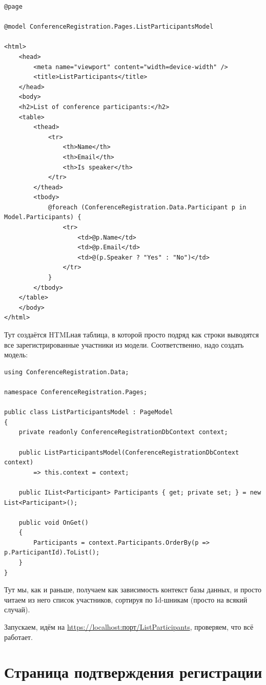 \documentclass[a5paper]{article}
\begin{document}
\begin{verbatim}
@page

@model ConferenceRegistration.Pages.ListParticipantsModel

<html>
    <head>
        <meta name="viewport" content="width=device-width" />
        <title>ListParticipants</title>
    </head>
    <body>
    <h2>List of conference participants:</h2>
    <table>
        <thead>
            <tr>
                <th>Name</th>
                <th>Email</th>
                <th>Is speaker</th>
            </tr>
        </thead>
        <tbody>
            @foreach (ConferenceRegistration.Data.Participant p in Model.Participants) {
                <tr>
                    <td>@p.Name</td>
                    <td>@p.Email</td>
                    <td>@(p.Speaker ? "Yes" : "No")</td>
                </tr>
            }
        </tbody>
    </table>
    </body>
</html>
\end{verbatim}

Тут создаётся HTMLная таблица, в которой просто подряд как строки выводятся все зарегистрированные участники из модели. Соответственно, надо создать модель:

\begin{verbatim}
using ConferenceRegistration.Data;

namespace ConferenceRegistration.Pages;

public class ListParticipantsModel : PageModel
{
    private readonly ConferenceRegistrationDbContext context;

    public ListParticipantsModel(ConferenceRegistrationDbContext context)
        => this.context = context;

    public IList<Participant> Participants { get; private set; } = new List<Participant>();

    public void OnGet()
    {
        Participants = context.Participants.OrderBy(p => p.ParticipantId).ToList();
    }
}
\end{verbatim}

Тут мы, как и раньше, получаем как зависимость контекст базы данных, и просто читаем из него список участников, сортируя по Id-шникам (просто на всякий случай).

Запускаем, идём на \url{https://localhost:порт/ListParticipants}, проверяем, что всё работает.

\section{Страница подтверждения регистрации}
\end{document}
